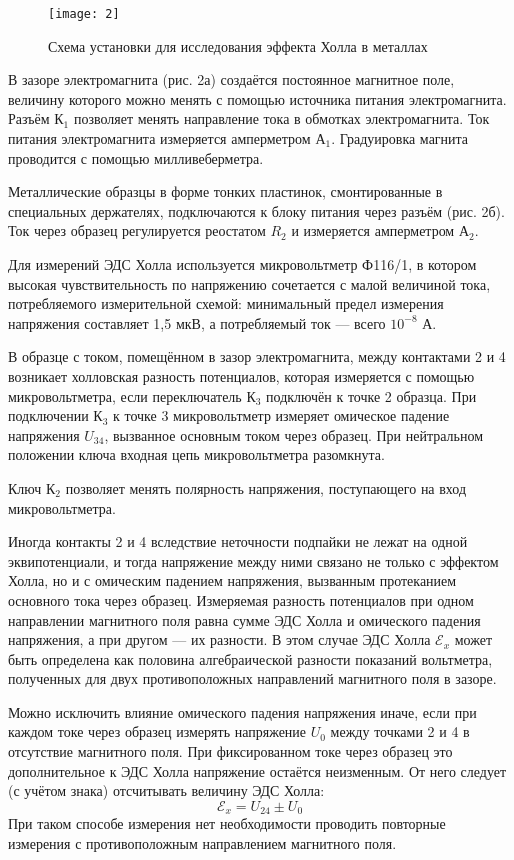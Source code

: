 \begin{figure}[H]
    \texttt{[image: 2]} 
    \captionsetup{justification=centering}
    \caption{Схема установки для
    исследования эффекта Холла в
металлах}
\end{figure}

В зазоре электромагнита (рис. 2а)
создаётся постоянное магнитное поле,
величину которого можно менять с помощью
источника питания электромагнита. Разъём
$\text{К}_1$ позволяет менять направление тока в
обмотках электромагнита. Ток питания
электромагнита измеряется амперметром
$\text{А}_1$. Градуировка магнита
проводится с помощью милливеберметра.

Металлические образцы в форме тонких
пластинок, смонтированные в специальных
держателях, подключаются к блоку питания
через разъём (рис. 2б). Ток через
образец регулируется реостатом $R_2$ и
измеряется амперметром $\text{А}_2$.

Для измерений ЭДС Холла используется
микровольтметр Ф116/1, в котором высокая
чувствительность по напряжению
сочетается с малой величиной тока,
потребляемого измерительной схемой:
минимальный предел измерения напряжения
составляет 1,5 мкВ, а потребляемый ток —
всего $10^{-8}$ А.

В образце с током, помещённом в зазор
электромагнита, между контактами 2 и 4
возникает холловская разность
потенциалов, которая измеряется с
помощью микровольтметра, если
переключатель $\text{К}_3$ подключён к точке 2
образца. При подключении $\text{К}_3$ к точке 3
микровольтметр измеряет омическое
падение напряжения $U_{34}$, вызванное
основным током через образец. При
нейтральном положении ключа входная цепь
микровольтметра разомкнута.

Ключ $\text{К}_2$ позволяет менять
полярность напряжения, поступающего на
вход микровольтметра.

Иногда контакты 2 и 4 вследствие
неточности подпайки не лежат на одной
эквипотенциали, и тогда напряжение между
ними связано не только с эффектом Холла,
но и с омическим падением напряжения,
вызванным протеканием основного тока
через образец. Измеряемая разность
потенциалов при одном направлении
магнитного поля равна сумме ЭДС Холла и
омического падения напряжения, а при
другом — их разности. В этом случае ЭДС
Холла $\mathscr{E}_x$ может быть определена как
половина алгебраической разности
показаний вольтметра, полученных для
двух противоположных направлений
магнитного поля в зазоре.

Можно исключить влияние омического
падения напряжения иначе, если при
каждом токе через образец измерять
напряжение $U_0$ между точками 2 и 4 в
отсутствие магнитного поля. При
фиксированном токе через образец это
дополнительное к ЭДС Холла напряжение
остаётся неизменным. От него следует (с
учётом знака) отсчитывать величину ЭДС
Холла:
\begin{equation}
    \mathscr{E}_x = U_{24} \pm U_0
\end{equation}
При таком способе измерения нет
необходимости проводить повторные
измерения с противоположным направлением
магнитного поля.

